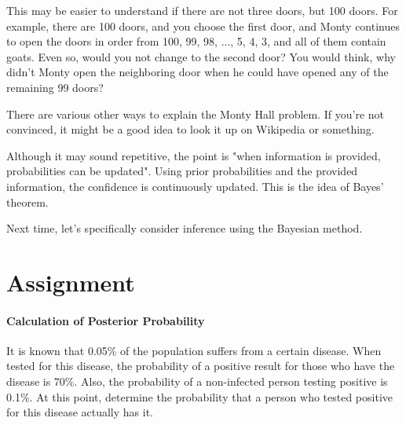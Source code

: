 \documentclass{ltjsbook}
\begin{document}
This may be easier to understand if there are not three doors, but 100 doors. For example, there are 100 doors, and you choose the first door, and Monty continues to open the doors in order from 100, 99, 98, ..., 5, 4, 3, and all of them contain goats. Even so, would you not change to the second door? You would think, why didn't Monty open the neighboring door when he could have opened any of the remaining 99 doors?

There are various other ways to explain the Monty Hall problem. If you're not convinced, it might be a good idea to look it up on Wikipedia or something.

Although it may sound repetitive, the point is "when information is provided, probabilities can be updated". Using prior probabilities and the provided information, the confidence is continuously updated. This is the idea of Bayes' theorem.

Next time, let's specifically consider inference using the Bayesian method.

\section{Assignment}
\paragraph{Calculation of Posterior Probability} It is known that 0.05\% of the population suffers from a certain disease. When tested for this disease, the probability of a positive result for those who have the disease is 70\%. Also, the probability of a non-infected person testing positive is 0.1\%. At this point, determine the probability that a person who tested positive for this disease actually has it.
\end{document}
